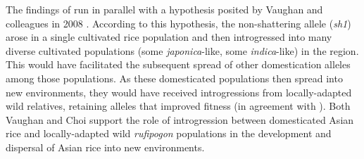 \documentclass[11pt]{article}
\begin{document}
\begin{enumerate}

The findings of \cite{choi2018multiple} run in parallel with a hypothesis posited by Vaughan and colleagues in 2008 \cite{vaughan2008evolving}.
According to this hypothesis, the non-shattering allele (\emph{sh1}) arose in a single cultivated rice population and then introgressed into many diverse cultivated populations (some \emph{japonica}-like, some \emph{indica}-like) in the region.
This would have facilitated the subsequent spread of other domestication alleles among those populations.
As these domesticated populations then spread into new environments, they would have received introgressions from locally-adapted wild relatives, retaining alleles that improved fitness (in agreement with \cite{second1982origin}).
Both Vaughan and Choi support the role of introgression between domesticated Asian rice and locally-adapted wild \emph{rufipogon} populations in the development and dispersal of Asian rice into new environments.


\end{enumerate}
\end{document}

